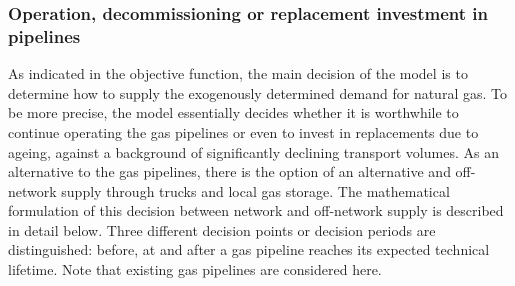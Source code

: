 \subsubsection{Operation, decommissioning or replacement investment in pipelines}
As indicated in the objective function, the main decision of the model is to determine how to supply the exogenously determined demand for natural gas. To be more precise, the model essentially decides whether it is worthwhile to continue operating the gas pipelines or even to invest in replacements due to ageing, against a background of significantly declining transport volumes. As an alternative to the gas pipelines, there is the option of an alternative and off-network supply through trucks and local gas storage. The mathematical formulation of this decision between network and off-network supply is described in detail below. Three different decision points or decision periods are distinguished: before, at and after a gas pipeline reaches its expected technical lifetime. Note that existing gas pipelines are considered here.\vspace{0.3cm}

